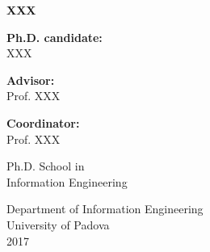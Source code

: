 \begin{titlepage}


\AddToShipoutPicture*{\coverBackground}
\vspace*{0.2cm}
\begin{center}
\textbf{\huge XXX}
\end{center}



\vspace{6cm}

\begin{flushright}
\large {\bf Ph.D. candidate: }\\
XXX \\
\end{flushright}

\vspace{0.5cm}

\begin{flushright}
\large {\bf Advisor: }\\
Prof. XXX
\end{flushright}

\vspace{0.5cm}

\begin{flushright}
\large {\bf Coordinator: }\\
Prof. XXX
\end{flushright}

\vspace{3.15cm}

\begin{flushright}
Ph.D. School in\\
Information Engineering
\end{flushright}

\vspace{0.15cm}

\begin{flushright}
Department of Information Engineering\\
University of Padova\\
2017
\end{flushright}


\end{titlepage}
